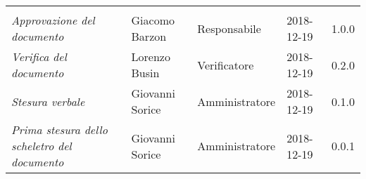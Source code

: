 \newpage 
\section*{}
\begin{table}[H]
	\centering
	\begin{tabular}{p{4cm}|C{3cm}|C{3cm}|R{2.5cm}|R{2cm}}
		
		 & & & & \\
		
		
		\emph{Approvazione del documento} &  Giacomo Barzon & Responsabile & 2018-12-19 & 1.0.0 \\
		\hline
		
		\emph{Verifica del documento} & Lorenzo Busin & Verificatore & 2018-12-19 & 0.2.0 \\
		\hline

		\emph{Stesura verbale} & Giovanni Sorice & Amministratore & 2018-12-19 & 0.1.0 \\
		\hline
		
		\emph{Prima stesura dello scheletro del documento} & Giovanni Sorice & Amministratore & 2018-12-19 & 0.0.1 \\
		
	\end{tabular}
	
\end{table}


\clearpage